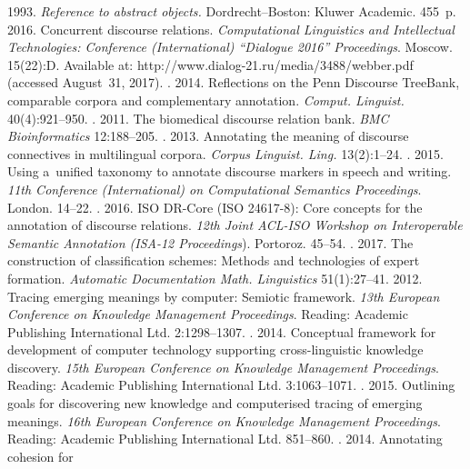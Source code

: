 \begin{multicols}{2}
{{\begin{thebibliography}{99}
   1993. \textit{Reference to abstract objects.} Dordrecht--Boston: 
Kluwer Academic. 455~p.
   2016. Concurrent discourse relations. \textit{Computational 
Linguistics and Intellectual Technologies: Conference (International) ``Dialogue 
2016'' Proceedings}. Moscow. 15(22):D.  Available at: {\sf 
http://www.dialog-21.ru/media/3488/webber.pdf} (accessed August~31, 2017).
  . 2014. Reflections on the Penn 
Discourse TreeBank, comparable corpora and complementary annotation. 
\textit{Comput. Linguist.} 40(4):921--950.
  . 2011. The 
biomedical discourse relation bank. \textit{BMC Bioinformatics} 12:188--205.
  . 2013. Annotating the meaning of discourse 
connectives in multilingual corpora. \textit{Corpus Linguist. Ling.} 13(2):1--24. 
  . 2015. Using a~unified taxonomy to annotate 
discourse markers in speech and writing. \textit{11th Conference (International) on 
Computational Semantics Proceedings}. London. 14--22.
  . 2016. ISO DR-Core (ISO 24617-8): Core 
concepts for the annotation of discourse relations. \textit{12th Joint ACL-ISO 
Workshop on Interoperable Semantic Annotation (ISA-12 Proceedings}). Portoroz. 
45--54.
  . 2017. The construction of 
classification schemes: Methods and technologies of expert formation. 
\textit{Automatic Documentation Math. Linguistics} 51(1):27--41.
   2012. Tracing emerging meanings by computer: Semiotic 
framework. \textit{13th European Conference on Knowledge Management 
Proceedings}. Reading: Academic Publishing International Ltd. 2:1298--1307.
  . 2014. Conceptual framework for development of computer 
technology supporting cross-linguistic knowledge discovery. \textit{15th European 
Conference on Knowledge Management Proceedings}. Reading: Academic 
Publishing International Ltd. 3:1063--1071.
  . 2015. Outlining goals for discovering new 
knowledge and computerised tracing of emerging meanings. \textit{16th European 
Conference on Knowledge Management Proceedings}. Reading: Academic 
Publishing International Ltd. 851--860.
  . 2014. Annotating cohesion for 

\end{thebibliography}}}
\end{multicols}
